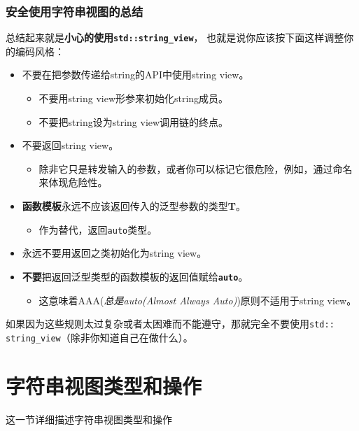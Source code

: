 \subsubsection{安全使用字符串视图的总结}
总结起来就是\textbf{小心的使用\texttt{std::string\_view}}，
也就是说你应该按下面这样调整你的编码风格：
\begin{itemize}
    \item 不要在把参数传递给string的API中使用string view。
    \begin{itemize}
        \item 不要用string view形参来初始化string成员。
        \item 不要把string设为string view调用链的终点。
    \end{itemize}
    \item 不要返回string view。
    \begin{itemize}
        \item 除非它只是转发输入的参数，或者你可以标记它很危险，例如，通过命名来体现危险性。
    \end{itemize}
    \item \textbf{函数模板}永远不应该返回传入的泛型参数的类型\textbf{T}。
    \begin{itemize}
        \item 作为替代，返回\texttt{auto}类型。
    \end{itemize}
    \item 永远不要用返回之类初始化为string view。
    \item \textbf{不要}把返回泛型类型的函数模板的返回值赋给\textbf{\texttt{auto}}。
    \begin{itemize}
        \item 这意味着AAA(\emph{总是auto(Almost Always Auto)})原则不适用于string view。
    \end{itemize}
\end{itemize}
如果因为这些规则太过复杂或者太困难而不能遵守，那就完全不要使用\texttt{std::
string\_view}（除非你知道自己在做什么）。


\section{字符串视图类型和操作}
这一节详细描述字符串视图类型和操作

